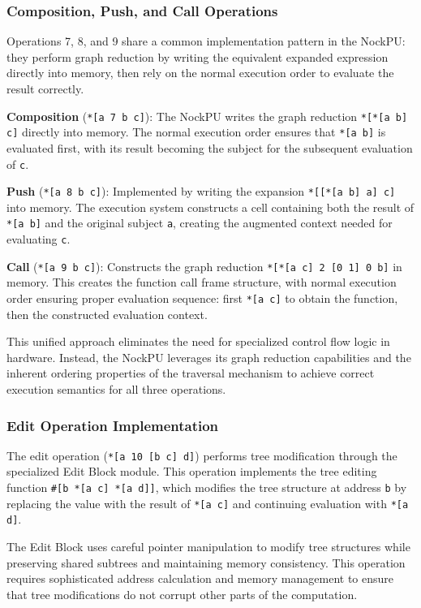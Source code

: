 \documentclass[twoside]{article}
\begin{document}
\subsubsection{Composition, Push, and Call Operations}

Operations 7, 8, and 9 share a common implementation pattern in the NockPU: they perform graph reduction by writing the equivalent expanded expression directly into memory, then rely on the normal execution order to evaluate the result correctly.

\textbf{Composition} (\texttt{*[a 7 b c]}): The NockPU writes the graph reduction \texttt{*[*[a b] c]} directly into memory. The normal execution order ensures that \texttt{*[a b]} is evaluated first, with its result becoming the subject for the subsequent evaluation of \texttt{c}.

\textbf{Push} (\texttt{*[a 8 b c]}): Implemented by writing the expansion \texttt{*[[*[a b] a] c]} into memory. The execution system constructs a cell containing both the result of \texttt{*[a b]} and the original subject \texttt{a}, creating the augmented context needed for evaluating \texttt{c}.

\textbf{Call} (\texttt{*[a 9 b c]}): Constructs the graph reduction \texttt{*[*[a c] 2 [0 1] 0 b]} in memory. This creates the function call frame structure, with normal execution order ensuring proper evaluation sequence: first \texttt{*[a c]} to obtain the function, then the constructed evaluation context.

This unified approach eliminates the need for specialized control flow logic in hardware. Instead, the NockPU leverages its graph reduction capabilities and the inherent ordering properties of the traversal mechanism to achieve correct execution semantics for all three operations.

\subsubsection{Edit Operation Implementation}

The edit operation (\texttt{*[a 10 [b c] d]}) performs tree modification through the specialized Edit Block module. This operation implements the tree editing function \texttt{\#[b *[a c] *[a d]]}, which modifies the tree structure at address \texttt{b} by replacing the value with the result of \texttt{*[a c]} and continuing evaluation with \texttt{*[a d]}.

The Edit Block uses careful pointer manipulation to modify tree structures while preserving shared subtrees and maintaining memory consistency. This operation requires sophisticated address calculation and memory management to ensure that tree modifications do not corrupt other parts of the computation.
\end{document}
